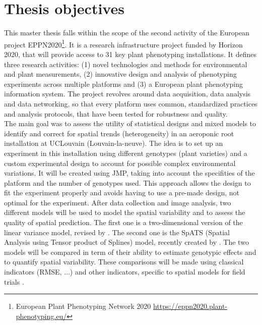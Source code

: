 \section{Thesis objectives}
This master thesis falls within the scope of the second activity of the European project EPPN2020\footnote{European Plant Phenotyping Network 2020 \url{https://eppn2020.plant-phenotyping.eu/}}. It is a research infrastructure project funded by  Horizon 2020, that will provide access to 31 key plant phenotyping installations. It defines three research activities: (1) novel technologies and methods for environmental and plant measurements, (2) innovative design and analysis of phenotyping experiments across multiple
platforms and (3) a European plant phenotyping information system. The project revolves around data acquisition, data analysis and data networking, so that every platform uses common, standardized practices and analysis protocols, that have been tested for robustness and quality.\\

The main goal was to assess the utility of statistical designs and mixed models to identify and correct for spatial trends (heterogeneity) in an aeroponic root installation at UCLouvain (Louvain-la-neuve). The idea is to set up an experiment in this installation using different genotypes (plant varieties) and a custom experimental design to account for possible complex environmental variations. It will be created using JMP, taking into account the specifities of the platform and the number of genotypes used. This approach allows the design to fit the experiment properly and avoids having to use a pre-made design, not optimal for the experiment.
After data collection and image analysis, two different models will be used to model the spatial variability and to assess the quality of spatial prediction. The first one is a two-dimensional version of the linear variance model, revised by \textcite{piepho_linear_2010}. The second one is the SpATS (Spatial Analysis using Tensor product of Splines) model, recently created by \textcite{rodriguez-alvarez_correcting_2018}. 
The two models will be compared in term of their ability to estimate genotypic effects and to quantify spatial variability. These comparisons will be made using classical indicators (RMSE, $\ldots$) and other indicators, specific to spatial models for field trials \parencite{oakey_joint_2006}.\\

